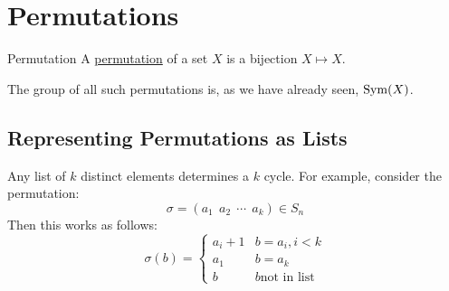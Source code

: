 \documentclass[../Main.tex]{subfiles}
\begin{document}
\section{Permutations}
\begin{definition}{Permutation}
    A \underline{permutation} of a set $X$ is a bijection $X \mapsto X$.
\end{definition}
The group of all such permutations is, as we have already seen, $\operatorname{Sym}(X)$.
\subsection{Representing Permutations as Lists}
Any list of $k$ distinct elements determines a $k$ cycle. For example, consider the permutation:
\begin{equation*}
    \sigma = (a_1~~a_2~~\cdots~~a_k) \in S_n
\end{equation*}
Then this works as follows:
\begin{equation*}
    \sigma(b) =
    \begin{cases}
        a_i + 1 & b = a_i, i<k \\
        a_1 & b = a_k \\
        b & b \text{not in list}
    \end{cases}
\end{equation*}
\end{document}
